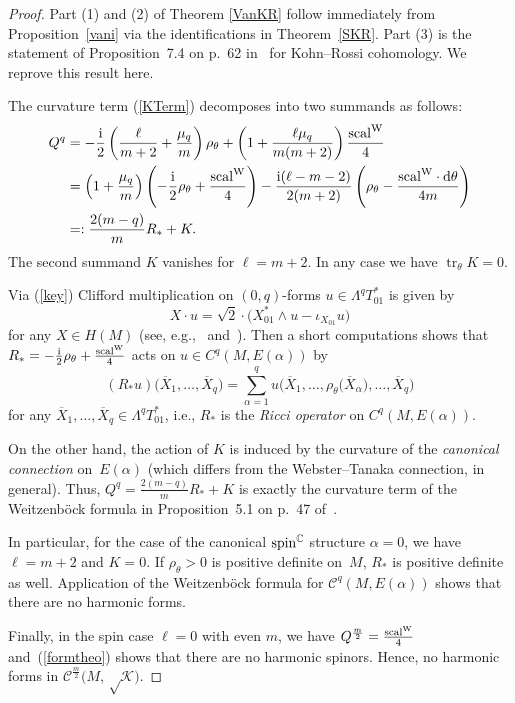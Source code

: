 \documentclass[10pt,a4paper]{amsart}
\numberwithin{equation}{section}
\newcommand{\CC}{\mathbb{C}}
\begin{document}
\begin{proof} Part (1) and (2) of Theorem \ref{VanKR} follow immediately from Proposition~\ref{vani} via the identifications in Theorem~\ref{SKR}.
Part (3) is the statement of Proposition~7.4 on p.~62 in~\cite{Tan} for Kohn--Rossi cohomology.
We reprove this result here.

The curvature term (\ref{KTerm}) decomposes into two summands as follows:
\begin{align*}
Q^q & = - \frac{{\rm i}}{2}\left( \frac{\ell}{m+2}+\frac{\mu_q}{m}\right)\rho_\theta + \left(1+\frac{\ell\mu_q}{m(m+2)}\right)\frac{{\rm scal}^{\rm W}}{4}\\
&= \left( 1+ \frac{\mu_q}{m} \right)\left( -\frac{{\rm i}}{2}\rho_\theta +\frac{{\rm scal}^{\rm W}}{4} \right) -
\frac{{\rm i}(\ell-m-2)}{2(m+2)}\left( \rho_\theta-\frac{{\rm scal}^{\rm W}\cdot {\rm d}\theta}{4m}\right)\\
&=: \frac{2(m-q)}{m}R_* + K.
\end{align*}
The second summand $K$ vanishes for $\ell=m+2$. In any case we have $\operatorname{tr}_\theta K=0$.

Via (\ref{key}) Clifford multiplication on $(0,q)$-forms $u\in \Lambda^qT^*_{01}$ is given by
\[
X\cdot u = \sqrt{2}\cdot\big( X^*_{01}\wedge u - \iota_{X_{01}}u \big)
\]
for any $X\in H(M)$ (see, e.g., \cite{Morg}~and~\cite{Pet}). Then a short computations shows that $R_*=-\frac{{\rm i}}{2}\rho_\theta +\frac{{\rm scal}^{\rm W}}{4}$ acts
on $u\in C^q(M,E(\alpha))$ by
\[
(R_*u)\big(\overline{X}_1,\dots,\overline{X}_q\big) = \sum_{\alpha=1}^q u\big(\overline{X}_1,\dots,\rho_\theta\big(\overline{X}_\alpha\big),\dots, \overline{X}_q\big)
\]
for any $\overline{X}_1,\dots,\overline{X}_q\in \Lambda^qT^*_{01}$, i.e., $R_*$ is the {\em Ricci operator} on $C^q(M,E(\alpha))$.

On the other hand, the action of $K$ is induced by the curvature of the {\em canonical connection} on~$E(\alpha)$ (which differs from the Webster--Tanaka connection, in general). Thus, $Q^q=\frac{2(m-q)}{m}R_*+K$ is exactly the curvature term of the Weitzenb\"ock formula in Proposition~5.1 on p.~47 of~\cite{Tan}.

In particular, for the case of the canonical ${\rm spin}^\CC$ structure $\alpha=0$, we have $\ell=m+2$ and $K=0$.
If $\rho_\theta> 0$ is positive definite on~$M$, $R_*$ is positive definite as well. Application of the Weitzenb\"ock formula for
$\mathcal{C}^q(M,E(\alpha))$ shows that there are no harmonic forms.

Finally, in the spin case $\ell=0$ with even $m$, we have $Q^{\frac{m}{2}}=\frac{{\rm scal}^{\rm W}}{4}$ and~(\ref{formtheo}) shows that there are no harmonic spinors. Hence, no harmonic forms in $\mathcal{C}^{\frac{m}{2}}\big(M,\sqrt\mathcal{{K}}\big)$.
\end{proof}
\end{document}
